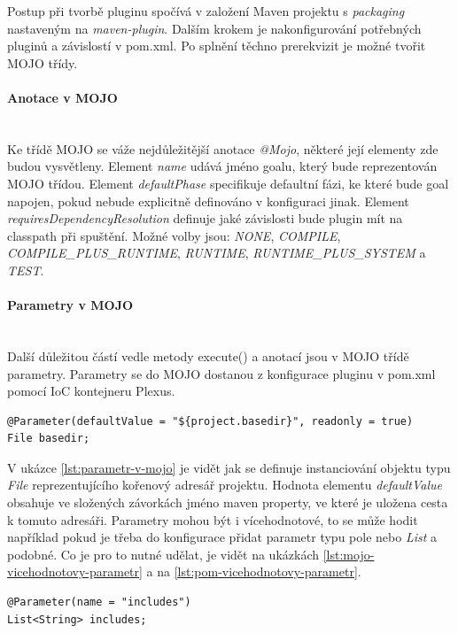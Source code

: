 \documentclass[11pt,twoside,a4paper]{book}
\begin{document}
Postup při tvorbě pluginu spočívá v založení Maven projektu s {\em packaging}
nastaveným na {\em maven-plugin}. Dalším krokem je nakonfigurování potřebných
pluginů a závislostí v pom.xml.
Po splnění těchno prerekvizit je možné tvořit MOJO třídy.

\paragraph{Anotace v MOJO}
\mbox{}\\

Ke třídě MOJO se váže nejdůležitější anotace {\em @Mojo}, některé její elementy
zde budou vysvětleny. Element {\em name} udává jméno goalu, který bude
reprezentován MOJO třídou.
Element {\em defaultPhase} specifikuje defaultní fázi, ke které bude goal
napojen, pokud nebude explicitně definováno v konfiguraci jinak. Element
{\em requiresDependencyResolution} definuje jaké závislosti bude plugin mít na
classpath při spuštění. Možné volby jsou: {\em NONE}, {\em COMPILE},
{\em COMPILE\_PLUS\_RUNTIME}, {\em RUNTIME}, {\em RUNTIME\_PLUS\_SYSTEM} a {\em
TEST}.

\paragraph{Parametry v MOJO}
\mbox{}\\

Další důležitou částí vedle metody execute() a anotací jsou v MOJO třídě parametry. Parametry
se do MOJO dostanou z konfigurace pluginu v pom.xml pomocí IoC kontejneru Plexus.

\begin{lstlisting}[frame=single,caption={Definice parametru v
Mojo},label={lst:parametr-v-mojo}] 
@Parameter(defaultValue = "${project.basedir}", readonly = true) 
File basedir;
\end{lstlisting}

V ukázce \ref{lst:parametr-v-mojo} je vidět jak se definuje instanciování
objektu typu {\em File} reprezentujícího kořenový adresář projektu. Hodnota
elementu {\em defaultValue} obsahuje ve složených závorkách jméno maven
property, ve které je uložena cesta k tomuto adresáři. Parametry mohou být i
vícehodnotové, to se může hodit například pokud je třeba do konfigurace přidat
parametr typu pole nebo {\em List} a podobné. Co je pro to nutné udělat, je
vidět na ukázkách \ref{lst:mojo-vicehodnotovy-parametr} a na
\ref{lst:pom-vicehodnotovy-parametr}.

\begin{lstlisting}[frame=single,caption={Definice vícehodnotového parametru v
Mojo},label={lst:mojo-vicehodnotovy-parametr}] 
@Parameter(name = "includes")
List<String> includes;
\end{lstlisting}
\end{document}
